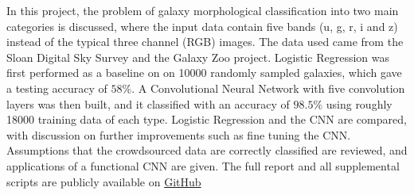 In this project, the problem of galaxy morphological classification into two main categories is discussed, where the input data contain five bands (u, g, r, i and z) instead of the typical three channel (RGB) images. 
The data used came from the Sloan Digital Sky Survey and the Galaxy Zoo project.
Logistic Regression was first performed as a baseline on on 10000 randomly sampled galaxies, which gave a testing accuracy of $58\%$. 
A Convolutional Neural Network with five convolution layers was then built, and it classified with an accuracy of $98.5\%$ using roughly 18000 training data of each type. 
Logistic Regression and the CNN are compared, with discussion on further improvements such as fine tuning the CNN.
Assumptions that the crowdsourced data are correctly classified are reviewed, and applications of a functional CNN are given. The full report and all supplemental scripts are publicly available on \href{https://github.com/klaykulik/galaxyCNN}{GitHub}

